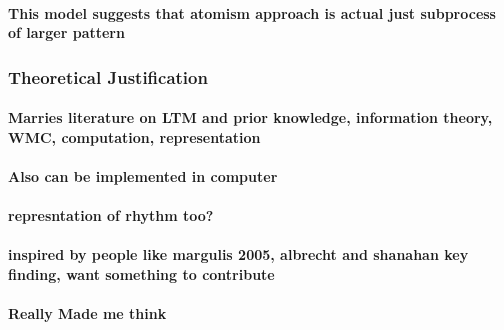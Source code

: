 \documentclass[]{book}
\let\oldparagraph\paragraph
\renewcommand{\paragraph}[1]{\oldparagraph{#1}\mbox{}}
\theoremstyle{definition}
\theoremstyle{definition}
\theoremstyle{definition}
\theoremstyle{remark}
\begin{document}
\hypertarget{this-model-suggests-that-atomism-approach-is-actual-just-subprocess-of-larger-pattern}{%
\paragraph{This model suggests that atomism approach is actual just
subprocess of larger
pattern}\label{this-model-suggests-that-atomism-approach-is-actual-just-subprocess-of-larger-pattern}}

\hypertarget{theoretical-justification}{%
\subsubsection{Theoretical
Justification}\label{theoretical-justification}}

\hypertarget{marries-literature-on-ltm-and-prior-knowledge-information-theory-wmc-computation-representation}{%
\paragraph{Marries literature on LTM and prior knowledge, information
theory, WMC, computation,
representation}\label{marries-literature-on-ltm-and-prior-knowledge-information-theory-wmc-computation-representation}}

\hypertarget{also-can-be-implemented-in-computer}{%
\paragraph{Also can be implemented in
computer}\label{also-can-be-implemented-in-computer}}

\hypertarget{represntation-of-rhythm-too}{%
\paragraph{represntation of rhythm
too?}\label{represntation-of-rhythm-too}}

\hypertarget{inspired-by-people-like-margulis-2005-albrecht-and-shanahan-key-finding-want-something-to-contribute}{%
\paragraph{inspired by people like margulis 2005, albrecht and shanahan
key finding, want something to
contribute}\label{inspired-by-people-like-margulis-2005-albrecht-and-shanahan-key-finding-want-something-to-contribute}}

\hypertarget{really-made-me-think}{%
\paragraph{Really Made me think}\label{really-made-me-think}}
\end{document}
